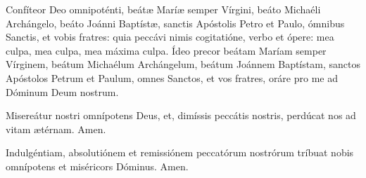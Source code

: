 \documentclass[a4paper, twoside, 12pt]{article}
\begin{document}
\vfill
\pagebreak


\noindent Confíteor Deo omnipoténti, beátæ Maríæ semper Vírgini, beáto
Michaéli Archángelo, beáto Joánni Baptístæ, sanctis Apóstolis Petro
et Paulo, ómnibus Sanctis, et vobis fratres: quia peccávi nimis cogitatióne,
verbo et ópere: mea culpa, mea culpa, mea máxima culpa.
Ídeo precor beátam Maríam semper Vírginem, beátum Michaélum
Archángelum, beátum Joánnem Baptístam, sanctos Apóstolos Petrum
et Paulum, omnes Sanctos, et vos fratres, oráre pro me ad Dóminum
Deum nostrum.

\vfill

\noindent Misereátur nostri omnípotens Deus, et, dimíssis peccátis nostris, perdúcat
nos ad vitam ætérnam. \Rbardot{} Amen.

\vfill

\noindent Indulgéntiam, absolutiónem et remissiónem peccatórum nostrórum tríbuat nobis
omnípotens et miséricors Dóminus. \Rbardot{} Amen.

\vfill



\vfill


\vfill
\pagebreak



\trComplAntI




\vfill
\pagebreak

 



\pagebreak

 


\end{document}
